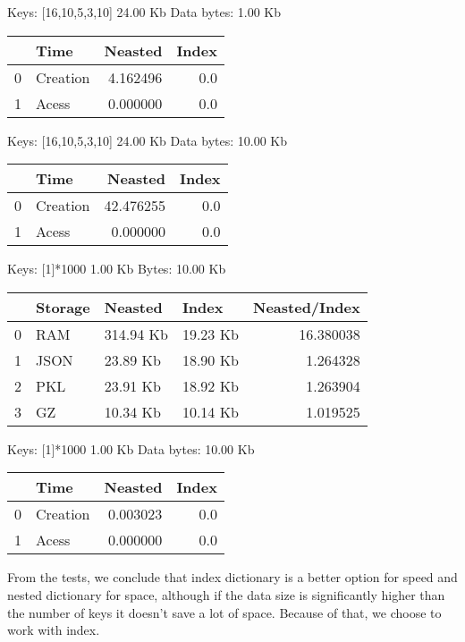 {Keys: [16,10,5,3,10] 24.00 Kb  Data bytes: 1.00 Kb 

\begin{tabular}{llrr}
	\toprule
	{} &      Time &   Neasted &  Index \\
	\midrule
	0 &  Creation &  4.162496 &    0.0 \\
	1 &     Acess &  0.000000 &    0.0 \\
	\bottomrule
\end{tabular}


Keys: [16,10,5,3,10] 24.00 Kb  Data bytes: 10.00 Kb 

\begin{tabular}{llrr}
	\toprule
	{} &      Time &    Neasted &  Index \\
	\midrule
	0 &  Creation &  42.476255 &    0.0 \\
	1 &     Acess &   0.000000 &    0.0 \\
	\bottomrule
\end{tabular}


Keys: [1]*1000 1.00 Kb  Bytes: 10.00 Kb 

\begin{tabular}{llllr}
	\toprule
	{} & Storage &    Neasted &     Index &  Neasted/Index \\
	\midrule
	0 &     RAM &  314.94 Kb &  19.23 Kb &      16.380038 \\
	1 &   JSON  &   23.89 Kb &  18.90 Kb &       1.264328 \\
	2 &     PKL &   23.91 Kb &  18.92 Kb &       1.263904 \\
	3 &      GZ &   10.34 Kb &  10.14 Kb &       1.019525 \\
	\bottomrule
\end{tabular}


Keys: [1]*1000 1.00 Kb  Data bytes: 10.00 Kb 

\begin{tabular}{llrr}
	\toprule
	{} &      Time &   Neasted &  Index \\
	\midrule
	0 &  Creation &  0.003023 &    0.0 \\
	1 &     Acess &  0.000000 &    0.0 \\
	\bottomrule
\end{tabular}

}

From the tests, we conclude that index dictionary is a better option for speed and nested dictionary for space, although if the data size is significantly higher than the number of keys it doesn't save a lot of space. Because of that, we choose to work with index.

